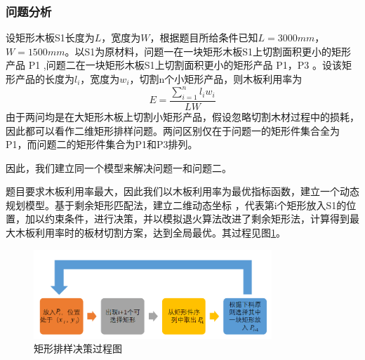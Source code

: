 \documentclass[hyperref,UTF8]{article}
\begin{document}
{\subsubsection{问题分析}
设矩形木板S1长度为$L$，宽度为$W$，根据题目所给条件已知$L=3000mm$，$W=1500mm$。以S1为原材料，问题一在一块矩形木板S1上切割面积更小的矩形产品 P1 ,问题二在一块矩形木板S1上切割面积更小的矩形产品 P1，P3 。设该矩形产品的长度为$l_i$，宽度为$w_i$，切割n个小矩形产品，则木板利用率为
\begin{equation}\label{liyongligongshi}
  E=\frac{\sum_{i=1}^{n}{l_iw_i}}{LW}
\end{equation}
由于两问均是在大矩形木板上切割小矩形产品，假设忽略切割木材过程中的损耗，因此都可以看作二维矩形排样问题。两问区别仅在于问题一的矩形件集合全为P1，而问题二的矩形件集合为P1和P3排列。\par 因此，我们建立同一个模型来解决问题一和问题二。\par
题目要求木板利用率最大，因此我们以木板利用率为最优指标函数，建立一个动态规划模型。基于剩余矩形匹配法，建立二维动态坐标 ，代表第i个矩形放入S1的位置，加以约束条件，进行决策，并以模拟退火算法改进了剩余矩形法，计算得到最大木板利用率时的板材切割方案，达到全局最优。其过程见图\ref{paiyang}。
\begin{figure}[htbp]
  \centering
  \includegraphics[width=0.8\textwidth]{picture/liucheng}
  \caption{矩形排样决策过程图}\label{paiyang}
\end{figure}
}
\end{document}
